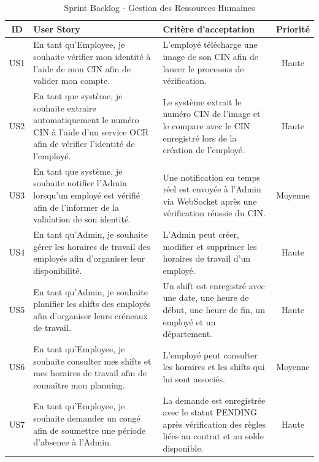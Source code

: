 \begin{longtable}{|c|>{\RaggedRight\arraybackslash}p{5cm}|>{\RaggedRight\arraybackslash}p{5cm}|c|}
\caption{Sprint Backlog - Gestion des Ressources Humaines}
\label{tab:sprint_backlog_rh}\\
    \hline

\textbf{ID} & \textbf{User Story} & \textbf{Critère d'acceptation} & \textbf{Priorité} \\


\hline

US1 &
En tant qu'Employee, je souhaite vérifier mon identité à l'aide de mon CIN afin de valider mon compte. &
L'employé télécharge une image de son CIN afin de lancer le processus de vérification. &
Haute
\\
\hline

US2 &
En tant que système, je souhaite extraire automatiquement le numéro CIN à l'aide d'un service OCR afin de vérifier l'identité de l'employé. &
Le système extrait le numéro CIN de l'image et le compare avec le CIN enregistré lors de la création de l'employé. &
Haute
\\
\hline

US3 &
En tant que système, je souhaite notifier l'Admin lorsqu'un employé est vérifié afin de l'informer de la validation de son identité. &
Une notification en temps réel est envoyée à l'Admin via WebSocket après une vérification réussie du CIN. &
Moyenne
\\
\hline

US4 &
En tant qu'Admin, je souhaite gérer les horaires de travail des employés afin d'organiser leur disponibilité. &
L'Admin peut créer, modifier et supprimer les horaires de travail d'un employé. &
Haute
\\
\hline

US5 &
En tant qu'Admin, je souhaite planifier les shifts des employés afin d'organiser leurs créneaux de travail. &
Un shift est enregistré avec une date, une heure de début, une heure de fin, un employé et un département. &
Haute
\\
\hline

US6 &
En tant qu'Employee, je souhaite consulter mes shifts et mes horaires de travail afin de connaître mon planning. &
L'employé peut consulter les horaires et les shifts qui lui sont associés. &
Moyenne
\\
\hline

US7 &
En tant qu'Employee, je souhaite demander un congé afin de soumettre une période d'absence à l'Admin. &
La demande est enregistrée avec le statut PENDING après vérification des règles liées au contrat et au solde disponible. &
Haute
\\
\hline


\end{longtable}
